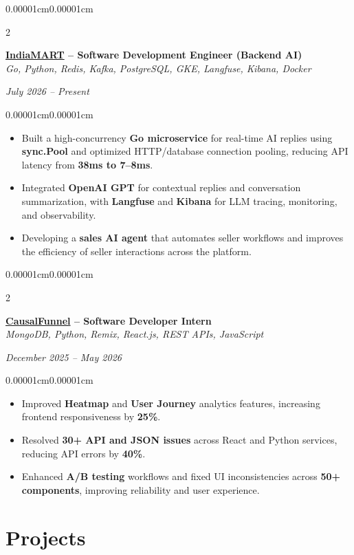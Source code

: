 \documentclass[10pt,letterpaper]{article}
\newenvironment{highlights}{
    \begin{itemize}[
        topsep=0.06cm,
        parsep=0.04cm,
        partopsep=0pt,
        itemsep=0pt,
        leftmargin=10pt
    ]
}{
    \end{itemize}
}
\newenvironment{onecolentry}{
    \begin{adjustwidth}{0.00001cm}{0.00001cm}
}{
    \end{adjustwidth}
}
\newenvironment{twocolentry}[1]{
    \onecolentry
    \def\secondColumn{#1}
    \setcolumnwidth{\fill,4.5cm}
    \begin{paracol}{2}
}{
    \switchcolumn
    \raggedleft
    \secondColumn
    \end{paracol}
    \endonecolentry
}
\begin{document}
\begin{twocolentry}{\textit{July 2026 -- Present}}
    \textbf{\href{https://www.linkedin.com/company/indiamart-intermesh-limited/posts/}{IndiaMART} -- Software Development Engineer (Backend AI)}\\
    \textit{Go, Python, Redis, Kafka, PostgreSQL, GKE, Langfuse, Kibana, Docker}
\end{twocolentry}
\begin{onecolentry}
    \begin{highlights}
        \item Built a high-concurrency \textbf{Go microservice} for real-time AI replies using \textbf{sync.Pool} and optimized HTTP/database connection pooling, reducing API latency from \textbf{38ms to 7--8ms}.
        \item Integrated \textbf{OpenAI GPT} for contextual replies and conversation summarization, with \textbf{Langfuse} and \textbf{Kibana} for LLM tracing, monitoring, and observability.
        \item Developing a \textbf{sales AI agent} that automates seller workflows and improves the efficiency of seller interactions across the platform.
    \end{highlights}
\end{onecolentry}

\begin{twocolentry}{\textit{December 2025 -- May 2026}}
    \textbf{\href{https://www.linkedin.com/company/causalfunnel/}{CausalFunnel} -- Software Developer Intern}\\
    \textit{MongoDB, Python, Remix, React.js, REST APIs, JavaScript}
\end{twocolentry}
\begin{onecolentry}
    \begin{highlights}
        \item Improved \textbf{Heatmap} and \textbf{User Journey} analytics features, increasing frontend responsiveness by \textbf{25\%}.
        \item Resolved \textbf{30+ API and JSON issues} across React and Python services, reducing API errors by \textbf{40\%}.
        \item Enhanced \textbf{A/B testing} workflows and fixed UI inconsistencies across \textbf{50+ components}, improving reliability and user experience.
    \end{highlights}
\end{onecolentry}

\section{Projects}
\end{document}
